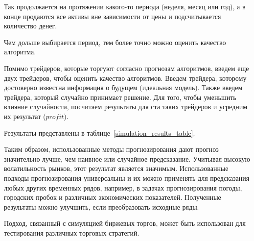 \documentclass[a4paper,article,14pt]{extarticle}
\begin{document}
Так продолжается на протяжении какого-то периода (неделя, месяц или год), а в конце продаются все активы вне зависимости от цены и подсчитывается количество денег.

Чем дольше выбирается период, тем более точно можно оценить качество алгоритма.

Помимо трейдеров, которые торгуют согласно прогнозам алгоритмов, введем еще двух трейдеров, чтобы оценить качество алгоритмов.
Введем трейдера, которому достоверно известна информация о будущем (идеальная модель).
Также введем трейдера, который случайно принимает решение.
Для того, чтобы уменьшить влияние случайности, посчитаем результаты для ста таких трейдеров и усредним их результат ($profit$).

Результаты представлены в таблице~\ref{simulation_results_table}.



Таким образом, использованные методы прогнозирования дают прогноз значительно лучше, чем наивное или случайное предсказание.
Учитывая высокую волатильность рынков, этот результат является значимым.
Использованные подходы прогнозирования универсальны и их можно применять для предсказания любых других временных рядов, например, в задачах прогнозирования погоды, городских пробок и различных экономических показателей. Полученные результаты можно улучшить, если преобразовать исходные ряды.


Подход, связанный с симуляцией биржевых торгов, может быть использован для тестирования различных торговых стратегий.
\end{document}

